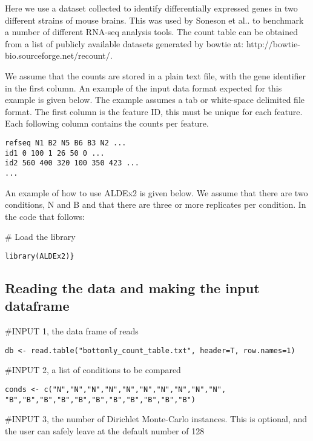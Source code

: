 \documentclass[11pt]{amsart}
\begin{document}
Here we use a dataset collected to identify differentially expressed genes in two different strains of mouse brains. This was used by Soneson et al.. \cite{Soneson:2013} to benchmark a number of different RNA-seq analysis tools. The count table can be obtained from a list of  publicly available datasets generated by bowtie at: http://bowtie-bio.sourceforge.net/recount/.

We assume that the counts are stored in a plain text file, with the gene identifier in the first column. An example of the input data format expected for this example is given below. The example assumes a tab or white-space delimited file format. The first column is the feature ID, this must be unique for each feature. Each following column contains the counts per feature.
\begin{verbatim}
refseq N1 B2 N5 B6 B3 N2 ...
id1 0 100 1 26 50 0 ...
id2 560 400 320 100 350 423 ...
...
\end{verbatim}

An example of how to use ALDEx2 is given below. We assume that there are two conditions, N and B and that there are three or more replicates per condition. In the code that follows:

\noindent \#  Load the library\\
\begin{verbatim}library(ALDEx2)}
\end{verbatim}

\subsection{Reading the data and making the input dataframe}

\noindent\#INPUT 1, the data frame of reads\\
\begin{verbatim}db <- read.table("bottomly_count_table.txt", header=T, row.names=1)\end{verbatim}

\noindent\#INPUT 2, a list of conditions to be compared\\
\begin{verbatim}conds <- c("N","N","N","N","N","N","N","N","N","N",
"B","B","B","B","B","B","B","B","B","B","B")
\end{verbatim}

\noindent\#INPUT 3, the number of Dirichlet Monte-Carlo instances. This is optional, and the user can safely leave at the default number of 128\\
\end{document}
